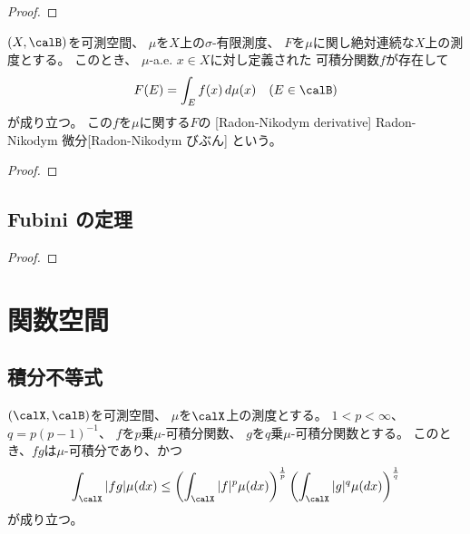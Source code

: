 \documentclass[report]{jlreq}
\begin{document}
\begin{proof}
    \TODO{}
\end{proof}

\begin{theorem}
    $(X, \calB)$を可測空間、
    $\mu$を$X$上の$\sigma$-有限測度、
    $F$を$\mu$に関し絶対連続な$X$上の測度とする。
    このとき、
    $\mu$-a.e. $x \in X$に対し定義された
    可積分関数$f$が存在して
    \begin{equation}
        F(E) = \int_E f(x) \, d\mu(x)
            \quad
            (E \in \calB)
    \end{equation}
    が成り立つ。
    この$f$を$\mu$に関する$F$の
    [Radon-Nikodym derivative]
        {Radon-Nikodym 微分}[Radon-Nikodym びぶん]
    という。
\end{theorem}

\begin{proof}
    \TODO{}
\end{proof}

%
\section{Fubini の定理}

\begin{theorem}
    \TODO{}
\end{theorem}

\begin{proof}
    \TODO{}
\end{proof}



%
\chapter{関数空間}

%
\section{積分不等式}

\begin{proposition}
    $(\calX, \calB)$を可測空間、
    $\mu$を$\calX$上の測度とする。
    $1 < p < \infty$、$q = p(p - 1)^{-1}$、
    $f$を$p$乗$\mu$-可積分関数、
    $g$を$q$乗$\mu$-可積分関数とする。
    このとき、$fg$は$\mu$-可積分であり、かつ
    \begin{equation}
        \int_\calX |fg| \mu(dx)
            \le \myparen{
                \int_\calX |f|^{p} \mu(dx)
            }^{\frac{1}{p}}
            \myparen{
                \int_\calX |g|^{q} \mu(dx)
            }^{\frac{1}{q}}
    \end{equation}
    が成り立つ。
\end{proposition}
\end{document}

